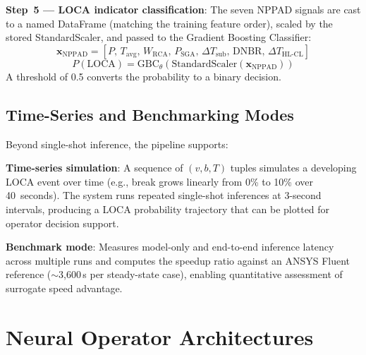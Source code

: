 \documentclass[journal]{IEEEtran}
\begin{document}
\textbf{Step~5 --- LOCA indicator classification}: The seven NPPAD signals are cast to a named DataFrame (matching the training feature order), scaled by the stored StandardScaler, and passed to the Gradient Boosting Classifier:
\begin{equation}
\bm{x}_{\text{NPPAD}} =
\left[
P,\,
T_{\text{avg}},\,
W_{\text{RCA}},\,
P_{\text{SGA}},\,
\Delta T_{\text{sub}},\,
\mathrm{DNBR},\,
\Delta T_{\text{HL-CL}}
\right]
\end{equation}
\begin{equation}
P(\mathrm{LOCA}) =
\mathrm{GBC}_{\theta}\!\left(
\mathrm{StandardScaler}\!\left(\bm{x}_{\text{NPPAD}}\right)
\right)
\end{equation}
A threshold of 0.5 converts the probability to a binary decision.

\subsection{Time-Series and Benchmarking Modes}

Beyond single-shot inference, the pipeline supports:

\textbf{Time-series simulation}: A sequence of $(v, b, T)$ tuples simulates a developing LOCA event over time (e.g., break grows linearly from 0\% to 10\% over 40~seconds). The system runs repeated single-shot inferences at 3-second intervals, producing a LOCA probability trajectory that can be plotted for operator decision support.

\textbf{Benchmark mode}: Measures model-only and end-to-end inference latency across multiple runs and computes the speedup ratio against an ANSYS Fluent reference ($\sim$3,600\,s per steady-state case), enabling quantitative assessment of surrogate speed advantage.

\section{Neural Operator Architectures}
\label{sec:architectures}
\end{document}
